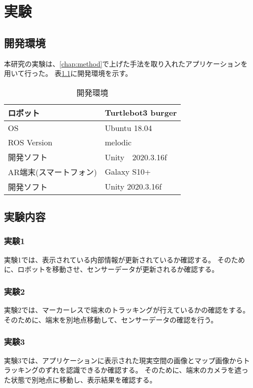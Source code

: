 \chapter{実験}\label{chap:experiment}


\section{開発環境}

本研究の実験は、\ref{chap:method}で上げた手法を取り入れたアプリケーションを用いて行った。
表\ref{開発環境}に開発環境を示す。

\begin{table}[H]
\centering
  \caption{開発環境}
  \label{開発環境}
  \begin{tabular}{|l|l|}  \hline
   ロボット & Turtlebot3 burger \\ \hline
   OS & Ubuntu 18.04 \\ \hline
   ROS Version & melodic \\ \hline
   開発ソフト & Unity　2020.3.16f \\ \hline
   AR端末(スマートフォン) & Galaxy S10+ \\ \hline
   開発ソフト & Unity 2020.3.16f \\ \hline
  \end{tabular}
\end{table}


\section{実験内容}


\subsection{実験1}

実験1では、表示されている内部情報が更新されているか確認する。
そのために、ロボットを移動させ、センサーデータが更新されるか確認する。


\subsection{実験2}

実験2では、マーカーレスで端末のトラッキングが行えているかの確認をする。
そのために、端末を別地点移動して、センサーデータの確認を行う。


\subsection{実験3}

実験3では、アプリケーションに表示された現実空間の画像とマップ画像からトラッキングのずれを認識できるか確認する。
そのために、端末のカメラを遮った状態で別地点に移動し、表示結果を確認する。